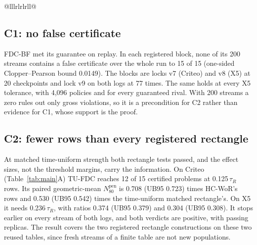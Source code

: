 \documentclass[sigconf,anonymous,review]{acmart}
\newcommand{\Npen}{N_{80}^{\text{pen}}}
\begin{document}
\begin{table}[t]
\begin{tabular}{@{}lllrlrlrll@{}}
\midrule
{} \\
\bottomrule
\end{tabular}
\end{table}

\subsection{C1: no false certificate}\label{sec:c1}

FDC-BF met its guarantee on replay. In each registered block, none of its 200 streams contains a false certificate over the whole run to 15 of 15 (one-sided Clopper--Pearson bound 0.0149). The blocks are locks v7 (Criteo) and v8 (X5) at 20 checkpoints and lock v9 on both logs at 77 times. The same holds at every X5 tolerance, with 4,096 policies and for every guaranteed rival. With 200 streams a zero rules out only gross violations, so it is a precondition for C2 rather than evidence for C1, whose support is the proof.

\subsection{C2: fewer rows than every registered rectangle}\label{sec:c2}

At matched time-uniform strength both rectangle tests passed, and the effect sizes, not the threshold margins, carry the information. On Criteo (Table~\ref{tab:main}A) TU-FDC reaches 12 of 15 certified problems at 0.125\,$\tau_R$ rows. Its paired geometric-mean $\Npen$ is 0.708 (UB95 0.723) times HC-WoR's rows and 0.530 (UB95 0.542) times the time-uniform matched rectangle's. On X5 it needs 0.236\,$\tau_R$, with ratios 0.374 (UB95 0.379) and 0.304 (UB95 0.308). It stops earlier on every stream of both logs, and both verdicts are positive, with passing replicas. The result covers the two registered rectangle constructions on these two reused tables, since fresh streams of a finite table are not new populations.
\end{document}
